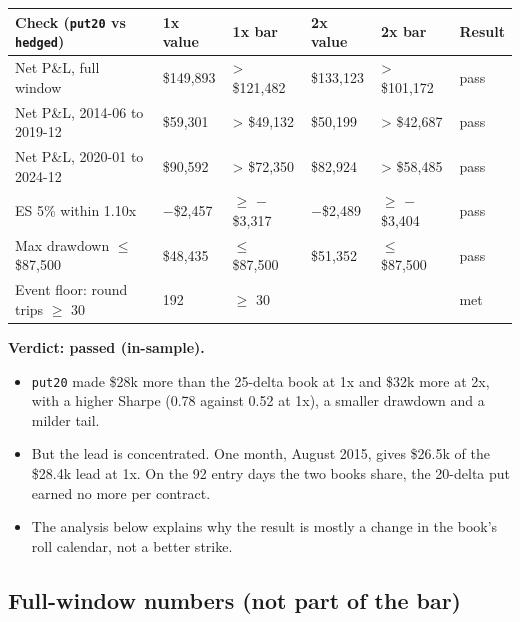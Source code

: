 \documentclass{article}
\begin{document}
\begin{center}\small
\begin{tabularx}{\linewidth}{>{\raggedright\arraybackslash}X l l l l l}
\toprule
\textbf{Check (\texttt{put20} vs \texttt{hedged})} & \textbf{1x value} & \textbf{1x bar} & \textbf{2x value} & \textbf{2x bar} & \textbf{Result} \\
\midrule
Net P\&L, full window & \$149,893 & > \$121,482 & \$133,123 & > \$101,172 & pass \\
Net P\&L, 2014-06 to 2019-12 & \$59,301 & > \$49,132 & \$50,199 & > \$42,687 & pass \\
Net P\&L, 2020-01 to 2024-12 & \$90,592 & > \$72,350 & \$82,924 & > \$58,485 & pass \\
ES 5\% within 1.10x & \ensuremath{-}\$2,457 & \ensuremath{\geq} \ensuremath{-}\$3,317 & \ensuremath{-}\$2,489 & \ensuremath{\geq} \ensuremath{-}\$3,404 & pass \\
Max drawdown \ensuremath{\leq} \$87,500 & \$48,435 & \ensuremath{\leq} \$87,500 & \$51,352 & \ensuremath{\leq} \$87,500 & pass \\
Event floor: round trips \ensuremath{\geq} 30 & 192 & \ensuremath{\geq} 30 &  &  & met \\
\bottomrule
\end{tabularx}
\end{center}

\textbf{Verdict: passed (in-sample).}

\begin{itemize}

\item \texttt{put20} made \$28k more than the 25-delta book at 1x and \$32k more at 2x, with a higher Sharpe (0.78 against 0.52 at 1x), a smaller drawdown and a milder tail.

\item But the lead is concentrated. One month, August 2015, gives \$26.5k of the \$28.4k lead at 1x. On the 92 entry days the two books share, the 20-delta put earned no more per contract.

\item The analysis below explains why the result is mostly a change in the book's roll calendar, not a better strike.

\end{itemize}

\subsection{Full-window numbers (not part of the bar)}
\end{document}
